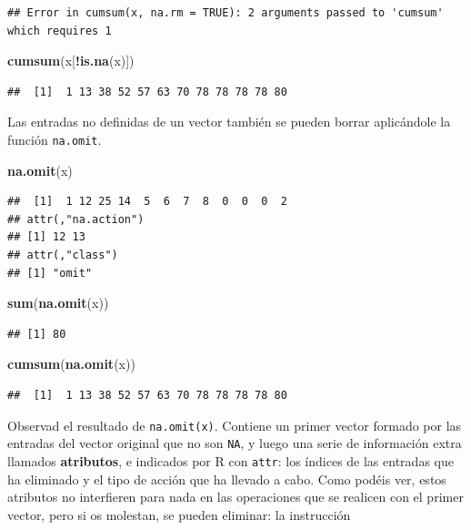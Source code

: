 \documentclass[]{book}
\newenvironment{Shaded}{\begin{snugshade}}{\end{snugshade}}
\newcommand{\KeywordTok}[1]{\textcolor[rgb]{0.13,0.29,0.53}{\textbf{#1}}}
\newcommand{\NormalTok}[1]{#1}
\newcommand{\OperatorTok}[1]{\textcolor[rgb]{0.81,0.36,0.00}{\textbf{#1}}}
\theoremstyle{definition}
\theoremstyle{definition}
\theoremstyle{definition}
\theoremstyle{remark}
\begin{document}
\begin{verbatim}
## Error in cumsum(x, na.rm = TRUE): 2 arguments passed to 'cumsum' which requires 1
\end{verbatim}

\begin{Shaded}
\begin{Highlighting}[]
\KeywordTok{cumsum}\NormalTok{(x[}\OperatorTok{!}\KeywordTok{is.na}\NormalTok{(x)])}
\end{Highlighting}
\end{Shaded}

\begin{verbatim}
##  [1]  1 13 38 52 57 63 70 78 78 78 78 80
\end{verbatim}

Las entradas no definidas de un vector también se pueden borrar aplicándole la función \texttt{na.omit}.

\begin{Shaded}
\begin{Highlighting}[]
\KeywordTok{na.omit}\NormalTok{(x)}
\end{Highlighting}
\end{Shaded}

\begin{verbatim}
##  [1]  1 12 25 14  5  6  7  8  0  0  0  2
## attr(,"na.action")
## [1] 12 13
## attr(,"class")
## [1] "omit"
\end{verbatim}

\begin{Shaded}
\begin{Highlighting}[]
\KeywordTok{sum}\NormalTok{(}\KeywordTok{na.omit}\NormalTok{(x))}
\end{Highlighting}
\end{Shaded}

\begin{verbatim}
## [1] 80
\end{verbatim}

\begin{Shaded}
\begin{Highlighting}[]
\KeywordTok{cumsum}\NormalTok{(}\KeywordTok{na.omit}\NormalTok{(x))}
\end{Highlighting}
\end{Shaded}

\begin{verbatim}
##  [1]  1 13 38 52 57 63 70 78 78 78 78 80
\end{verbatim}

Observad el resultado de \texttt{na.omit(x)}. Contiene un primer vector formado por las entradas del vector original que no son \texttt{NA}, y luego una serie de información extra llamados \textbf{atributos}, e indicados por R con \texttt{attr}: los índices de las entradas que ha eliminado y el tipo de acción que ha llevado a cabo.
Como podéis ver, estos atributos no interfieren para nada en las operaciones que se realicen con el primer vector, pero si os molestan, se pueden eliminar: la instrucción
\end{document}
